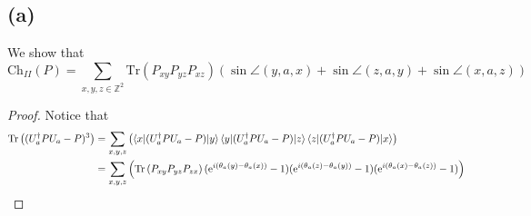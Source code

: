 \documentclass[a4paper,11pt]{article}
\newcommand{\euler}[1]{\text{e}^{#1}}
\newcommand{\trace}[1]{\text{Tr}\left(#1\right)}
\newcommand{\Z}{\mathbb{Z}}
\numberwithin{equation}{section}
\begin{document}
\subsection*{(a)}
We show that \begin{equation}
\text{Ch}_{II}(P)=\sum_{x,y,z\in\Z^2}\trace{P_{xy}P_{yz}P_{xz}}\left(\sin\angle(y,a,x)+\sin\angle(z,a,y)+\sin\angle(x,a,z)\right)
\end{equation}
\begin{proof}
	Notice that \begin{equation}
	\begin{aligned}
	\trace{(U_a^\dagger PU_a-P)^3}&=\sum_{x,y,z}\left(\braket{x|(U_a^\dagger PU_a-P)|y}\braket{y|(U_a^\dagger PU_a-P)|z}\braket{z|(U_a^\dagger PU_a-P)|x}\right)\\
	&=\sum_{x,y,z}\left(\trace{P_{xy}P_{yz}P_{zx}}(\euler{i(\theta_a(y)-\theta_a(x))}-1)(\euler{i(\theta_a(z)-\theta_a(y))}-1)(\euler{i(\theta_a(x)-\theta_a(z))}-1)\right)
	\end{aligned}
	\end{equation}
\end{proof}
\end{document}
